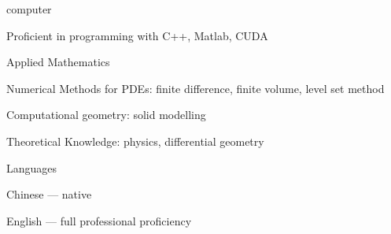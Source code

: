 
\begin{cvskills}
  \cvskill
    {computer} %
    {
      \begin{cvitems} %
        \item {Proficient in programming with C++, Matlab, CUDA}
      \end{cvitems}
    } %

    \cvskill
    {Applied Mathematics} %
    {
      \begin{cvitems} %
        \item {Numerical Methods for PDEs: finite difference, finite volume, level set method}
        \item {Computational geometry: solid modelling}
        \item {Theoretical Knowledge: physics, differential geometry}
      \end{cvitems}
    } %
    
  \cvskill
    {Languages} %
    {
      \begin{cvitems} %
        \item {Chinese --- native}
        \item {English --- full professional proficiency}
      \end{cvitems}
    } %
\end{cvskills}
